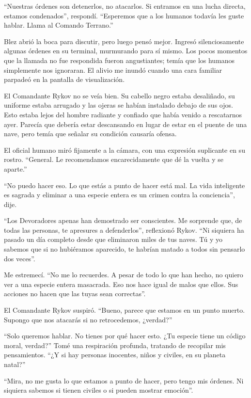 \documentclass[spanish,12pt,a4paper,oneside,titlepage]{book}
\begin{document}
    “Nuestras órdenes son detenerlos, no atacarlos. Si entramos en una lucha directa, estamos condenados”, respondí. “Esperemos que a los humanos todavía les guste hablar. Llama al Comando Terrano.”

    Blez abrió la boca para discutir, pero luego pensó mejor. Ingresó silenciosamente algunas órdenes en su terminal, murmurando para sí mismo. Los pocos momentos que la llamada no fue respondida fueron angustiantes; temía que los humanos simplemente nos ignoraran. El alivio me inundó cuando una cara familiar parpadeó en la pantalla de visualización.

    El Comandante Rykov no se veía bien. Su cabello negro estaba desaliñado, su uniforme estaba arrugado y las ojeras se habían instalado debajo de sus ojos. Esto estaba lejos del hombre radiante y confiado que había venido a rescatarnos ayer. Parecía que debería estar descansando en lugar de estar en el puente de una nave, pero temía que señalar su condición causaría ofensa.

    El oficial humano miró fijamente a la cámara, con una expresión suplicante en su rostro. “General. Le recomendamos encarecidamente que dé la vuelta y se aparte.”

    “No puedo hacer eso. Lo que estás a punto de hacer está mal. La vida inteligente es sagrada y eliminar a una especie entera es un crimen contra la conciencia”, dije.

    “Los Devoradores apenas han demostrado ser conscientes. Me sorprende que, de todas las personas, te apresures a defenderlos”, reflexionó Rykov. “Ni siquiera ha pasado un día completo desde que eliminaron miles de tus naves. Tú y yo sabemos que si no hubiéramos aparecido, te habrían matado a todos sin pensarlo dos veces”.

    Me estremecí. “No me lo recuerdes. A pesar de todo lo que han hecho, no quiero ver a una especie entera masacrada. Eso nos hace igual de malos que ellos. Sus acciones no hacen que las tuyas sean correctas”.

    El Comandante Rykov suspiró. “Bueno, parece que estamos en un punto muerto. Supongo que nos atacarás si no retrocedemos, ¿verdad?”

    “Solo queremos hablar. No tienes por qué hacer esto. ¿Tu especie tiene un código moral, verdad?” Tomé una respiración profunda, tratando de recopilar mis pensamientos. “¿Y si hay personas inocentes, niños y civiles, en su planeta natal?”

    “Mira, no me gusta lo que estamos a punto de hacer, pero tengo mis órdenes. Ni siquiera sabemos si tienen civiles o si pueden mostrar emoción”.
\end{document}
